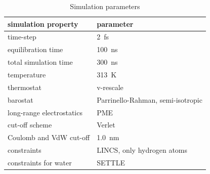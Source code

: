 \documentclass[aip,jcp,twocolumn]{revtex4}
\begin{document}
\begin{table}[btp!]
  \caption{Simulation parameters}
  \label{tbl:mdpar}
  \begin{tabular}{ll}
    simulation property & parameter   \\
    \hline
    time-step           & 2~fs         \\
    equilibration time  & 100~ns  \\
    total simulation time     & 300~ns  \\
    temperature         & 313~K       \\
    thermostat          & v-rescale  \cite{bussi07}   \\
    barostat            & Parrinello-Rahman, semi-isotropic \cite{parrinello81} \\
    long-range electrostatics & PME  \cite{darden93}  \\
    cut-off scheme      & Verlet \cite{Pall13}      \\
    Coulomb and VdW cut-off & 1.0~nm \\
    constraints         & LINCS, only hydrogen atoms \cite{hess97} \\
    constraints for water & SETTLE  \cite{miyamoto92} \\
    \hline
  \end{tabular}
\end{table}






\listoftodos
\end{document}
